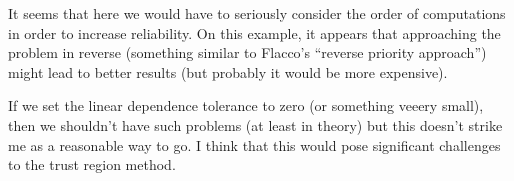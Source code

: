 \documentclass[12pt]{article}
\begin{document}
It seems that here we would have to seriously consider the order of computations in order to
increase reliability. On this example, it appears that approaching the problem in reverse (something
similar to Flacco's ``reverse priority approach'') might lead to better results (but probably it
would be more expensive).

If we set the linear dependence tolerance to zero (or something veeery small), then we shouldn't
have such problems (at least in theory) but this doesn't strike me as a reasonable way to go. I
think that this would pose significant challenges to the trust region method.
\end{document}

